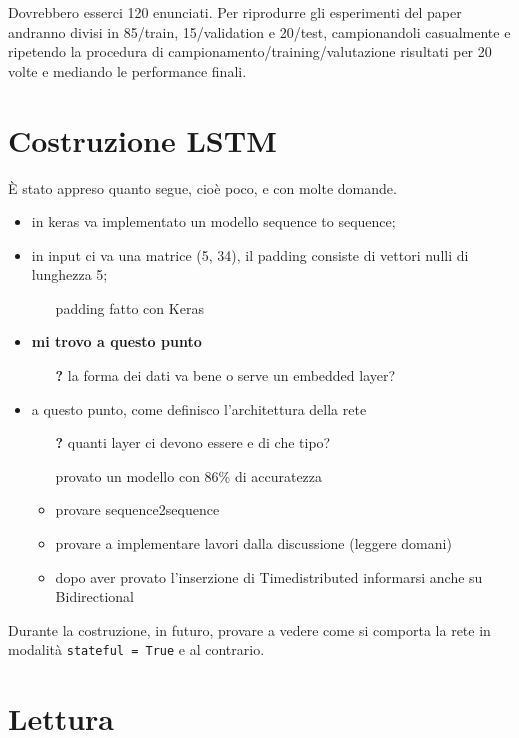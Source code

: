 \documentclass[twoside,twocolumn,11pt]{extarticle}
\theoremstyle{definition}
\begin{document}
	Dovrebbero esserci 120 enunciati. Per riprodurre gli esperimenti del paper \cite{bib:prominence-detection-italian} andranno divisi in 85/train, 15/validation e 20/test, campionandoli casualmente e ripetendo la procedura di campionamento/training/valutazione risultati per 20 volte e mediando le performance finali.
	
\section{Costruzione LSTM}
	È stato appreso quanto segue, cioè poco, e con molte domande.
	\begin{itemize}
		\item in keras va implementato un modello sequence to sequence;
		\item in input ci va una matrice (5, 34), il padding consiste di vettori nulli di lunghezza 5;
		\begin{itemize}
			\item[\textbf{\checkmark}] padding fatto con Keras
		\end{itemize}
		\item \textbf{mi trovo a questo punto}
		\begin{itemize}
			\item[\textbf{?}] la forma dei dati va bene o serve un embedded layer?
		\end{itemize}
		\item a questo punto, come definisco l'architettura della rete
		\begin{itemize}
			\item[\textbf{?}] quanti layer ci devono essere e di che tipo?
			\item[\checkmark] provato un modello con 86\% di accuratezza
			\item provare sequence2sequence
			\item provare a implementare lavori dalla discussione (leggere domani)
			\item dopo aver provato l'inserzione di Timedistributed informarsi anche su Bidirectional
		\end{itemize}
	\end{itemize}
	Durante la costruzione, in futuro, provare a vedere come si comporta la rete in modalità \texttt{stateful = True} e al contrario.

\section{Lettura \cite{bib:fenomeni-prosodici-prominenza}}
\end{document}
